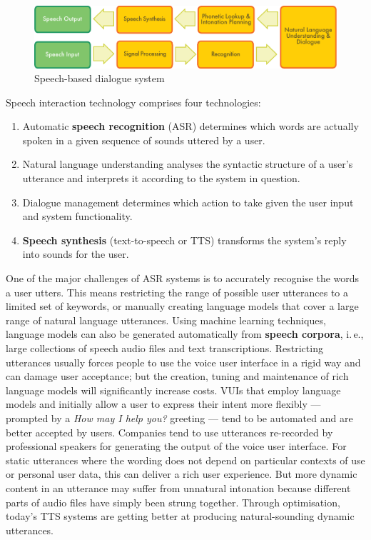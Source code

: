 \begin{multicols}{2}
\begin{figure}[htb]
  \center
  \includegraphics[width=\textwidth]{../_media/english/simple_speech-based_dialogue_architecture}
  \caption{Speech-based dialogue system}
  \label{fig:dialoguearch_en}
\end{figure}

Speech interaction technology comprises four technologies: 

\begin{enumerate}
\item Automatic \textbf{speech recognition} (ASR) determines which words are actually spoken in a given sequence of sounds uttered by a user.  
\item Natural language understanding analyses the syntactic structure of a user’s utterance and interprets it according to the system in question.
\item Dialogue management determines which action to take given the user input and system functionality.   
\item \textbf{Speech synthesis} (text-to-speech or TTS) transforms the system’s reply into sounds for the user.
\end{enumerate}

One of the major challenges of ASR systems is to accurately recognise the words a user utters. This means restricting the range of possible user utterances to a limited set of keywords, or manually creating language models that cover a large range of natural language utterances. Using machine learning techniques, language models can also be generated automatically from \textbf{speech corpora}, i.\,e., large collections of speech audio files and text transcriptions. Restricting utterances usually forces people to use the voice user interface in a rigid way and can damage user acceptance; but the creation, tuning and maintenance of rich language models will significantly increase costs. VUIs that employ language models and initially allow a user to express their intent more flexibly — prompted by a \textit{How may I help you?} greeting — tend to be automated and are better accepted by users.
Companies tend to use utterances re-recorded by professional speakers for generating the output of the voice user interface. For static utterances where the wording does not depend on particular contexts of use or personal user data, this can deliver a rich user experience. But more dynamic content in an utterance may suffer from unnatural intonation because different parts of audio files have simply been strung together. Through optimisation, today’s TTS systems are getting better at producing natural-sounding dynamic utterances.


\end{multicols}

